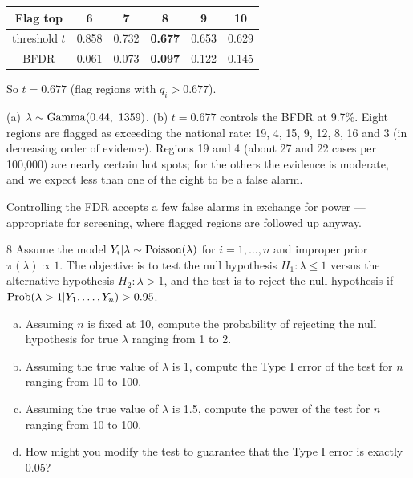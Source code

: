 \documentclass[11pt]{article}
\begin{document}
\begin{center}
\begin{tabular}{cccccc}\toprule
Flag top & 6 & 7 & \textbf{8} & 9 & 10\\\midrule
threshold $t$ & 0.858 & 0.732 & \textbf{0.677} & 0.653 & 0.629\\
BFDR & 0.061 & 0.073 & \textbf{0.097} & 0.122 & 0.145\\\bottomrule
\end{tabular}
\end{center}
So $t=0.677$ (flag regions with $q_i>0.677$).

\begin{answer}
(a) $\lambda\sim\dist{Gamma}(0.44,\ 1359)$. (b) $t=0.677$ controls the BFDR at 9.7\%. Eight regions are flagged as exceeding the national rate: 19, 4, 15, 9, 12, 8, 16 and 3 (in decreasing order of evidence). Regions 19 and 4 (about 27 and 22 cases per 100{,}000) are nearly certain hot spots; for the others the evidence is moderate, and we expect less than one of the eight to be a false alarm.
\end{answer}

\begin{takeaway}
Controlling the FDR accepts a few false alarms in exchange for power --- appropriate for screening, where flagged regions are followed up anyway.
\end{takeaway}


\begin{problem}{8}
Assume the model $Y_i|\lambda\sim\mathrm{Poisson}(\lambda)$ for $i=1,\dots,n$ and improper prior $\pi(\lambda)\propto1$. The objective is to test the null hypothesis $H_1:\lambda\le1$ versus the alternative hypothesis $H_2:\lambda>1$, and the test is to reject the null hypothesis if $\mathrm{Prob}(\lambda>1|Y_1,\dots,Y_n)>0.95$.
\begin{enumerate}[(a)]
\item Assuming $n$ is fixed at 10, compute the probability of rejecting the null hypothesis for true $\lambda$ ranging from 1 to 2.
\item Assuming the true value of $\lambda$ is 1, compute the Type I error of the test for $n$ ranging from 10 to 100.
\item Assuming the true value of $\lambda$ is 1.5, compute the power of the test for $n$ ranging from 10 to 100.
\item How might you modify the test to guarantee that the Type I error is exactly 0.05?
\end{enumerate}
\end{problem}
\end{document}
